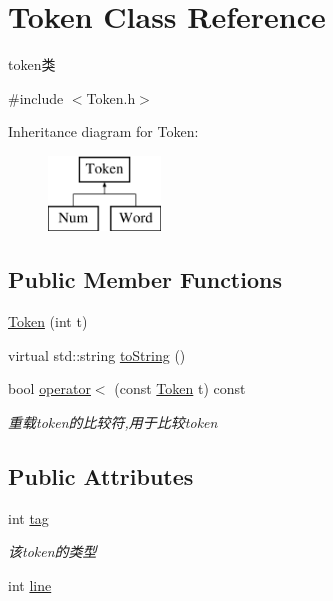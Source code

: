 \hypertarget{class_token}{}\section{Token Class Reference}
\label{class_token}


token类  




{\ttfamily \#include $<$Token.\+h$>$}

Inheritance diagram for Token\+:\begin{figure}[H]
\begin{center}
\leavevmode
\includegraphics[height=2.000000cm]{class_token}
\end{center}
\end{figure}
\subsection*{Public Member Functions}
\begin{DoxyCompactItemize}
\item 
\hyperlink{class_token_a29580f176bfba9981aeec62946114675}{Token} (int t)
\item 
virtual std\+::string \hyperlink{class_token_a8863381edabce7bc1e92473b445ba81f}{to\+String} ()
\item 
\mbox{\label{class_token_a745ea87ba20ab7e4d3f9061c62c179ca}} 
bool \hyperlink{class_token_a745ea87ba20ab7e4d3f9061c62c179ca}{operator$<$} (const \hyperlink{class_token}{Token} t) const
\begin{DoxyCompactList}\small\item\em 重载token的比较符,用于比较token \end{DoxyCompactList}\end{DoxyCompactItemize}
\subsection*{Public Attributes}
\begin{DoxyCompactItemize}
\item 
\mbox{\label{class_token_a2a4b0e1b648c2a9be1976004eb3c4ff0}} 
int \hyperlink{class_token_a2a4b0e1b648c2a9be1976004eb3c4ff0}{tag}
\begin{DoxyCompactList}\small\item\em 该token的类型 \end{DoxyCompactList}\item 
int \hyperlink{class_token_a4b96c2a31d7c374fd2bd1986794f80dd}{line}
\end{DoxyCompactItemize}



